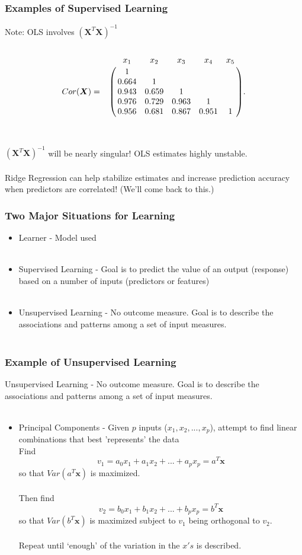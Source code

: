 \documentclass[hide notes,red,handout]{beamer}
\begin{document}
\begin{frame}[t]
\frametitle{Examples of Supervised Learning}
Note: OLS involves $(\boldsymbol{X}^{T}\boldsymbol{X})^{-1}$\\~\\
\[
Cor(\boldsymbol{X})=
\bordermatrix{~&x_{1} & x_{2} &x_{3} &x_{4} &x_{5} \cr
&1 \cr
&0.664 &1 \cr
 & 0.943& 0.659& 1& \cr
& 0.976&0.729 &0.963 &1\cr
& 0.956 &0.681& 0.867& 0.951 &1\cr}.
\]~\\~\\\pause
$(\boldsymbol{X}^{T}\boldsymbol{X})^{-1}$ will be nearly singular! OLS estimates highly unstable.\\~\\
Ridge Regression can help stabilize estimates and increase prediction accuracy when predictors are correlated!  (We'll come back to this.)
\end{frame}

\begin{frame}[t]
\frametitle{Two Major Situations for Learning}
\begin{itemize}
\item Learner - Model used\\~\\
\item Supervised Learning - Goal is to predict the value of an output (response) based on a number of inputs (predictors or features)\\~\\
\item Unsupervised Learning - No outcome measure.  Goal is to describe the associations and patterns among a set of input measures.\\~\\
\end{itemize}
\end{frame}

\begin{frame}[t]
\frametitle{Example of Unsupervised Learning}
Unsupervised Learning - No outcome measure.  Goal is to describe the associations and patterns among a set of input measures.\\~\\
\begin{itemize}
\item Principal Components - Given $p$ inputs ($x_1,x_2,...,x_p$), attempt to find linear combinations that best 'represents' the data\\\pause
Find 
$$v_1=a_0x_1+a_1x_2+...+a_px_p=a^{T}\textbf{x}$$
so that $Var(a^{T}\textbf{x})$ is maximized.\\~\\\pause
Then find 
$$v_2=b_0x_1+b_1x_2+...+b_px_p=b^{T}\textbf{x}$$
so that $Var(b^{T}\textbf{x})$ is maximized subject to $v_1$ being orthogonal to $v_2$.\\~\\\pause
Repeat until `enough' of the variation in the $x's$ is described.
\end{itemize}
\end{frame}
\end{document}
